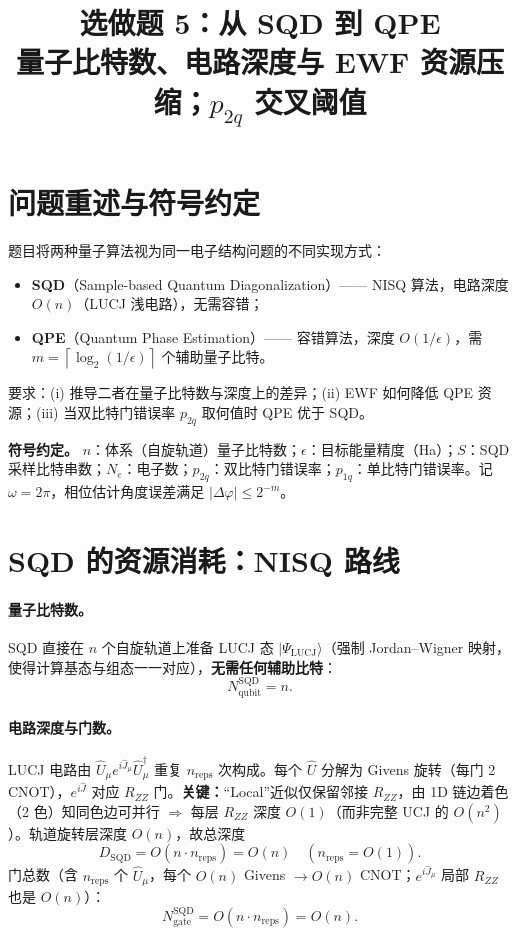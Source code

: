 \documentclass[11pt]{article}
\title{\textbf{选做题 5：从 SQD 到 QPE}\\[2pt]
\large 量子比特数、电路深度与 EWF 资源压缩；$p_{2q}$ 交叉阈值}
\author{}
\date{}
\newcommand{\eps}{\epsilon}
\newcommand{\Oof}[1]{O(#1)}
\newcommand{\ceil}[1]{\left\lceil #1 \right\rceil}
\begin{document}
\maketitle

\section{问题重述与符号约定}
题目将两种量子算法视为同一电子结构问题的不同实现方式：
\begin{itemize}
  \item \textbf{SQD}（Sample-based Quantum Diagonalization）—— NISQ 算法，电路深度 $\Oof{n}$（LUCJ 浅电路），无需容错；
  \item \textbf{QPE}（Quantum Phase Estimation）—— 容错算法，深度 $\Oof{1/\eps}$，需 $m=\ceil{\log_2(1/\eps)}$ 个辅助量子比特。
\end{itemize}
要求：(i) 推导二者在量子比特数与深度上的差异；(ii) EWF 如何降低 QPE 资源；(iii) 当双比特门错误率 $p_{2q}$ 取何值时 QPE 优于 SQD。

\noindent\textbf{符号约定。} $n$：体系（自旋轨道）量子比特数；$\eps$：目标能量精度（Ha）；$S$：SQD 采样比特串数；$N_e$：电子数；$p_{2q}$：双比特门错误率；$p_{1q}$：单比特门错误率。记 $\omega=2\pi$，相位估计角度误差满足 $|\Delta\varphi|\le 2^{-m}$。

\section{SQD 的资源消耗：NISQ 路线}
\paragraph{量子比特数。} SQD 直接在 $n$ 个自旋轨道上准备 LUCJ 态 $|\Psi_{\mathrm{LUCJ}}\rangle$（强制 Jordan--Wigner 映射，使得计算基态与组态一一对应），\textbf{无需任何辅助比特}：
\begin{equation}
  N_{\text{qubit}}^{\mathrm{SQD}} = n .
\end{equation}

\paragraph{电路深度与门数。} LUCJ 电路由 $\hat U_\mu e^{i\hat J_\mu}\hat U_\mu^\dagger$ 重复 $n_{\mathrm{reps}}$ 次构成。每个 $\hat U$ 分解为 Givens 旋转（每门 2 CNOT），$e^{i\hat J}$ 对应 $R_{ZZ}$ 门。\textbf{关键：}``Local''近似仅保留邻接 $R_{ZZ}$，由 1D 链边着色（2 色）知同色边可并行 $\Rightarrow$ 每层 $R_{ZZ}$ 深度 $\Oof{1}$（而非完整 UCJ 的 $\Oof{n^2}$）。轨道旋转层深度 $\Oof{n}$，故总深度
\begin{equation}\label{eq:sqd-depth}
  D_{\mathrm{SQD}} = \Oof{n\cdot n_{\mathrm{reps}}} = \Oof{n}\quad (n_{\mathrm{reps}}=\Oof{1}) .
\end{equation}
门总数（含 $n_{\mathrm{reps}}$ 个 $\hat U_\mu$，每个 $\Oof{n}$ Givens $\to \Oof{n}$ CNOT；$e^{i\hat J_\mu}$ 局部 $R_{ZZ}$ 也是 $\Oof{n}$）：
\begin{equation}
  N_{\mathrm{gate}}^{\mathrm{SQD}} = \Oof{n\cdot n_{\mathrm{reps}}} = \Oof{n}.
\end{equation}
\end{document}
